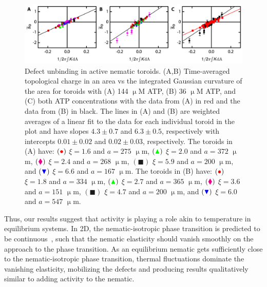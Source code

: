 \begin{figure}
  \centering
  \includegraphics{figures/C3/Ch3-Figs_DefectUnbinding.png}
  \caption{Defect unbinding in active nematic toroids.
  (A,B) Time-averaged topological charge in an area vs the integrated Gaussian curvature of the area for toroids with (A) 144 $\upmu$M ATP, (B) 36 $\upmu$M ATP, and (C) both ATP concentrations with the data from (A) in red and the data from (B) in black.
  The lines in (A) and (B) are weighted averages of a linear fit to the data for each individual toroid in the plot and have slopes $4.3 \pm 0.7$ and $6.3 \pm 0.5$, respectively with intercepts $0.01 \pm 0.02$ and $0.02 \pm 0.03$, respectively.
  The toroids in (A) have:
  $({\color{red} \bullet})$ $\xi = 1.6 $ and $a = 275$ $\upmu$m,
  $({\color{green} \blacktriangle})$ $\xi = 2.0 $ and $a = 372$ $\upmu$m,
  $({\color{magenta} \blacklozenge})$ $\xi = 2.4 $ and $a = 268$ $\upmu$m,
  $({\blacksquare})$ $\xi = 5.9$ and $a = 200$ $\upmu$m, and
  $({\color{blue} \blacktriangledown})$ $\xi = 6.6$ and $a = 167$ $\upmu$m.
  The toroids in (B) have:
  $({\color{red} \bullet})$ $\xi = 1.8 $ and $a = 334$ $\upmu$m,
  $({\color{green} \blacktriangle})$ $\xi = 2.7 $ and $a = 365$ $\upmu$m,
  $({\color{magenta} \blacklozenge})$ $\xi = 3.6 $ and $a = 151$ $\upmu$m,
  $({\blacksquare})$ $\xi = 4.7$ and $a = 200$ $\upmu$m, and
  $({\color{blue} \blacktriangledown})$ $\xi = 6.0$ and $a = 547$ $\upmu$m.}\label{f:3-DefectUnbinding}
\end{figure}

Thus, our results suggest that activity is playing a role akin to temperature in equilibrium systems.
In 2D, the  nematic-isotropic phase transition is predicted to be continuous~\cite{RN172}, such that the nematic elasticity should vanish smoothly on the approach to the phase transition.
As an equilibrium nematic gets sufficiently close to the nematic-isotropic phase transition, thermal fluctuations dominate the vanishing elasticity, mobilizing the defects and producing results qualitatively similar to adding activity to the nematic.





